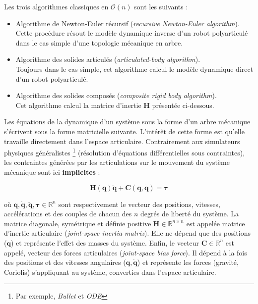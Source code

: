 Les trois algorithmes classiques en $\mathcal{O}(n)$ sont les suivants :
\begin{itemize}
    \item Algorithme de Newton-Euler récursif (\textit{recursive Newton-Euler algorithm}).\\
        Cette procédure résout le modèle dynamique inverse d'un robot polyarticulé
        dans le cas simple d'une topologie mécanique en arbre.
    \item Algorithme des solides articulés (\textit{articulated-body algorithm}).\\
        Toujours dans le cas simple, cet algorithme calcul le modèle
        dynamique direct d'un robot polyarticulé.
    \item Algorithme des solides composés (\textit{composite rigid body algorithm}).\\
        Cet algorithme calcul la matrice d'inertie $\bm{H}$ présentée ci-dessous.
    \newline
\end{itemize}

Les équations de la dynamique d'un système sous la forme
d'un arbre mécanique s'écrivent sous la forme matricielle suivante.
L'intérêt de cette forme est qu'elle travaille directement
dans l'espace articulaire. 
Contrairement aux simulateurs physiques 
\og généralistes \fg\footnote{Par exemple, \textit{Bullet} et \textit{ODE}}
(résolution d'équations différentielles sous contraintes),
les contraintes générées par les articulations
sur le mouvement du système mécanique sont ici \textbf{implicites} :

$$
\bm{H}(\bm{q})\bm{\ddot{q}} + \bm{C}(\bm{q}, \bm{\dot{q}}) = \bm{\tau}
$$

où $\bm{q}, \bm{\dot{q}}, \bm{\ddot{q}}, \bm{\tau} \in \mathbb{R}^{n}$ 
sont respectivement le vecteur des positions, vitesses, accélérations 
et des couples de chacun des $n$ degrés de liberté du système.
La matrice diagonale, symétrique et définie positive $\bm{H} \in \mathbb{R}^{n \times n}$ 
est appelée matrice d'inertie articulaire (\textit{joint-space inertia matrix}).
Elle ne dépend que des positions ($\bm{q}$) et représente l'effet des masses du système.
Enfin, le vecteur $\bm{C} \in \mathbb{R}^{n}$ est appelé, vecteur des forces articulaires
(\textit{joint-space bias force}).
Il dépend à la fois des positions et des vitesses angulaires ($\bm{q},\bm{\dot{q}}$) 
et représente les forces (gravité, Coriolis) s'appliquant au système,
converties dans l'espace articulaire.\\

